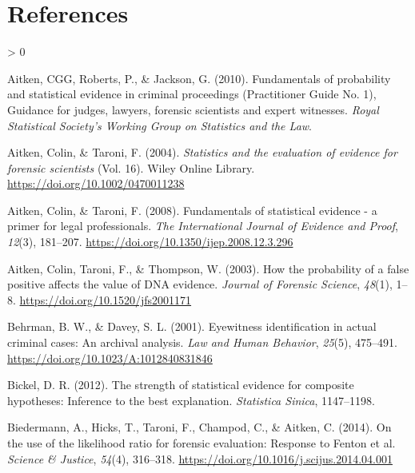 \documentclass[
  10pt,
  dvipsnames,enabledeprecatedfontcommands]{scrartcl}
\newlength{\cslhangindent}
\newenvironment{CSLReferences}[2] %
 {%
  \setlength{\parindent}{0pt}
  \ifodd #1 \everypar{\setlength{\hangindent}{\cslhangindent}}\ignorespaces\fi
  \ifnum #2 > 0
  \setlength{\parskip}{#2\baselineskip}
  \fi
 }%
 {}
\begin{document}
\hypertarget{references}{%
\section*{References}\label{references}}

\hypertarget{refs}{}
\begin{CSLReferences}{1}{0}
\leavevmode\hypertarget{ref-aitken2010fundamentals}{}%
Aitken, CGG, Roberts, P., \& Jackson, G. (2010). Fundamentals of
probability and statistical evidence in criminal proceedings
({P}ractitioner {G}uide {N}o. 1), {G}uidance for judges, lawyers,
forensic scientists and expert witnesses. \emph{Royal Statistical
Society's Working Group on Statistics and the Law}.

\leavevmode\hypertarget{ref-aitken2004statistics}{}%
Aitken, Colin, \& Taroni, F. (2004). \emph{Statistics and the evaluation
of evidence for forensic scientists} (Vol. 16). Wiley Online Library.
\url{https://doi.org/10.1002/0470011238}

\leavevmode\hypertarget{ref-aitken2008fundamentals}{}%
Aitken, Colin, \& Taroni, F. (2008). Fundamentals of statistical
evidence - a primer for legal professionals. \emph{The International
Journal of Evidence and Proof}, \emph{12}(3), 181--207.
\url{https://doi.org/10.1350/ijep.2008.12.3.296}

\leavevmode\hypertarget{ref-aitken2003probability}{}%
Aitken, Colin, Taroni, F., \& Thompson, W. (2003). How the probability
of a false positive affects the value of DNA evidence. \emph{Journal of
Forensic Science}, \emph{48}(1), 1--8.
\url{https://doi.org/10.1520/jfs2001171}

\leavevmode\hypertarget{ref-behrman2001EyewitnessIdentificationActual}{}%
Behrman, B. W., \& Davey, S. L. (2001). Eyewitness identification in
actual criminal cases: {An} archival analysis. \emph{Law and Human
Behavior}, \emph{25}(5), 475--491.
\url{https://doi.org/10.1023/A:1012840831846}

\leavevmode\hypertarget{ref-bickel2012strength}{}%
Bickel, D. R. (2012). The strength of statistical evidence for composite
hypotheses: Inference to the best explanation. \emph{Statistica Sinica},
1147--1198.

\leavevmode\hypertarget{ref-biedermann2014UseLikelihoodRatio}{}%
Biedermann, A., Hicks, T., Taroni, F., Champod, C., \& Aitken, C.
(2014). On the use of the likelihood ratio for forensic evaluation:
{Response} to {Fenton} et al. \emph{Science \& Justice}, \emph{54}(4),
316--318. \url{https://doi.org/10.1016/j.scijus.2014.04.001}


\end{CSLReferences}
\end{document}
